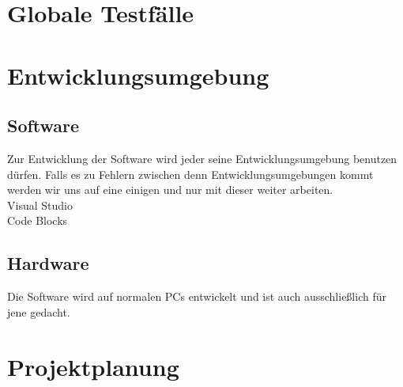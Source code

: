 \documentclass[a4paper,12pt]{scrreprt}
\begin{document}
\chapter{Globale Testfälle}

	
\chapter{Entwicklungsumgebung}
	
	\section{Software}
		Zur Entwicklung der Software wird jeder seine Entwicklungsumgebung benutzen dürfen. Falls es zu Fehlern zwischen denn Entwicklungsumgebungen kommt werden wir uns auf eine einigen und nur mit dieser weiter arbeiten.\\		
		Visual Studio \\
		Code Blocks
		
		
		
	\section{Hardware}
		
		
		Die Software wird auf normalen PCs entwickelt und ist auch ausschließlich für jene gedacht.
		
		
		
\chapter{Projektplanung}



	
	
\end{document}

